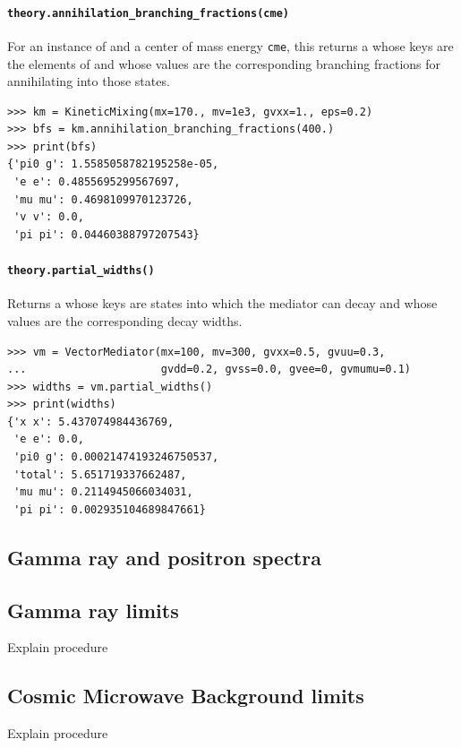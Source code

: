 \paragraph{\texttt{theory.annihilation\_branching\_fractions(cme)}} For an instance  of  and a center of mass energy \texttt{cme}, this returns a  whose keys are the elements of  and whose values are the corresponding branching fractions for annihilating into those states.
\begin{verbatim}
>>> km = KineticMixing(mx=170., mv=1e3, gvxx=1., eps=0.2)
>>> bfs = km.annihilation_branching_fractions(400.)
>>> print(bfs)
{'pi0 g': 1.5585058782195258e-05,
 'e e': 0.4855695299567697,
 'mu mu': 0.4698109970123726,
 'v v': 0.0,
 'pi pi': 0.04460388797207543}
\end{verbatim}

\paragraph{\texttt{theory.partial\_widths()}} Returns a  whose keys are states into which the mediator can decay and whose values are the corresponding decay widths.
\begin{verbatim}
>>> vm = VectorMediator(mx=100, mv=300, gvxx=0.5, gvuu=0.3,
...                     gvdd=0.2, gvss=0.0, gvee=0, gvmumu=0.1)
>>> widths = vm.partial_widths()
>>> print(widths)
{'x x': 5.437074984436769,
 'e e': 0.0,
 'pi0 g': 0.00021474193246750537,
 'total': 5.651719337662487,
 'mu mu': 0.2114945066034031,
 'pi pi': 0.002935104689847661}
\end{verbatim}

\subsection{Gamma ray and positron spectra}

\subsection{Gamma ray limits}

Explain procedure

\subsection{Cosmic Microwave Background limits}

Explain procedure

